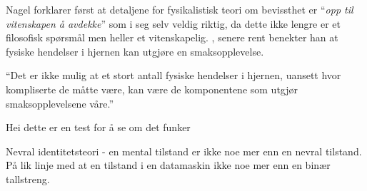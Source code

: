 Nagel forklarer først at detaljene for fysikalistisk teori om bevissthet er ``\emph{opp til vitenskapen å avdekke}'' som i seg selv veldig riktig, 
da dette ikke lengre er et filosofisk spørsmål men heller et vitenskapelig.
,
senere rent benekter han at fysiske hendelser i hjernen kan utgjøre en smaksopplevelse.
\begin{pquotation}{\cite[36]{Nagel2003}}
    ``Det er ikke mulig at et stort antall fysiske hendelser i hjernen,
uansett hvor kompliserte de måtte være, 
kan være de komponentene som utgjør smaksopplevelsene våre.''
\end{pquotation}

Hei dette er en test \autocite{snl:Böhmen} for å se om det funker

Nevral identitetsteori - en mental tilstand er ikke noe mer enn en nevral tilstand.
På lik linje med at en tilstand i en datamaskin ikke noe mer enn en binær tallstreng.